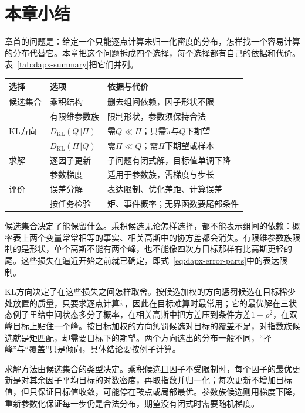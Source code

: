 \section{本章小结}
\label{sec:dapx-summary}

章首的问题是：给定一个只能逐点计算未归一化密度的分布，怎样找一个容易计算的分布代替它。本章把这个问题拆成四个选择，每个选择都有自己的依据和代价。表~\ref{tab:dapx-summary}把它们并列。

\begin{BookInlineTable}
 \centering
 \caption{逼近问题中的四个选择。}
 \label{tab:dapx-summary}
 \begin{tabular}{lll}
  \toprule
  选择 & 选项 & 依据与代价\\
  \midrule
  候选集合 & 乘积结构 & 删去组间依赖，因子形状不限\\
   & 有限维参数族 & 限制形状，参数须保持合法\\
  KL方向 & $D_{\mathrm{KL}}(Q\Vert\Pi)$ & 需$Q\ll\Pi$；只需$\widetilde{\pi}$与$Q$下期望\\
   & $D_{\mathrm{KL}}(\Pi\Vert Q)$ & 需$\Pi\ll Q$；需$\Pi$下期望或样本\\
  求解 & 逐因子更新 & 子问题有闭式解，目标值单调下降\\
   & 参数梯度 & 适用于参数族，需梯度与步长\\
  评价 & 误差分解 & 表达限制、优化差距、计算误差\\
   & 按任务检验 & 矩、事件概率；无界函数要尾部条件\\
  \bottomrule
 \end{tabular}
\end{BookInlineTable}

候选集合决定了能保留什么。乘积候选无论怎样选择，都不能表示组间的依赖：概率表上两个变量常常相等的事实、相关高斯中的协方差都会消失。有限维参数族限制的是形状，单个高斯不能有两个峰，也不能像四次方目标那样有比高斯更轻的尾。这些损失在逼近开始之前就已确定，即式~\eqref{eq:dapx-error-parts}中的表达限制。

KL方向决定了在这些损失之间怎样取舍。按候选加权的方向惩罚候选在目标稀少处放置的质量，只要求逐点计算$\widetilde{\pi}$，因此在目标难算时最常用；它的最优解在三状态例子里给中间状态多分了概率，在相关高斯中把方差压到条件方差$1-\rho^{2}$，在双峰目标上贴住一个峰。按目标加权的方向惩罚候选对目标的覆盖不足，对指数族候选就是矩匹配，却需要目标下的期望。两个方向选出的分布一般不同，“择峰”与“覆盖”只是倾向，具体结论要按例子计算。

求解方法由候选集合的类型决定。乘积候选且因子不受限制时，每个因子的最优更新是对其余因子平均目标的对数密度，再取指数并归一化；每次更新不增加目标值，但只保证目标值收敛，可能停在鞍点或局部最优。参数族候选则用梯度下降，重新参数化保证每一步仍是合法分布，期望没有闭式时需要随机梯度。

